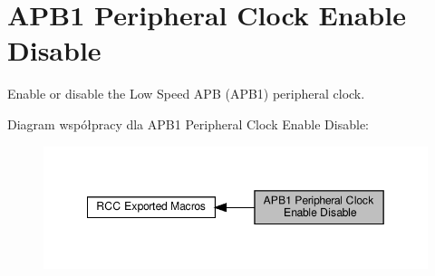 \hypertarget{group___r_c_c___a_p_b1___clock___enable___disable}{}\section{A\+P\+B1 Peripheral Clock Enable Disable}
\label{group___r_c_c___a_p_b1___clock___enable___disable}


Enable or disable the Low Speed A\+PB (A\+P\+B1) peripheral clock.  


Diagram współpracy dla A\+P\+B1 Peripheral Clock Enable Disable\+:\nopagebreak
\begin{figure}[H]
\begin{center}
\leavevmode
\includegraphics[width=349pt]{group___r_c_c___a_p_b1___clock___enable___disable}
\end{center}
\end{figure}
